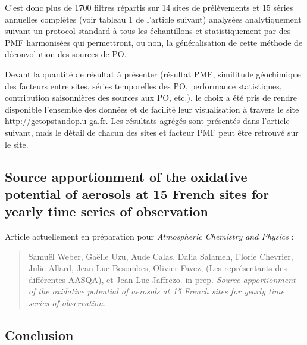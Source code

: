 C'est donc plus de 1700 filtres répartis sur 14 sites de prélèvements et 15 séries
annuelles complètes (voir tableau 1 de l'article suivant) analysées analytiquement suivant
un protocol standard à tous les échantillons et statistiquement par des PMF harmonisées
qui permettront, ou non, la généralisation de cette méthode de déconvolution des sources
de PO.

\begin{tcolorbox}[colback=red!5!white,colframe=Melon,title=Note]
    Devant la quantité de résultat à présenter (résultat PMF, similitude géochimique des
    facteurs entre sites, séries temporelles des PO, performance statistiques,
    contribution saisonnières des sources aux PO, etc.), le choix a été pris de rendre
    disponible l'ensemble des données et de facilité leur visualisation à travers le site
    \url{http://getopstandop.u-ga.fr}.
    Les résultats agrégés sont présentés dans l'article suivant, mais le détail de chacun
    des sites et facteur PMF peut être retrouvé sur le site.
\end{tcolorbox}

\subsection{Source apportionment of the oxidative potential of aerosols at 15 French
sites for yearly time series of observation}%
\label{sub:article}

\begin{tcolorbox}[colback=red!5!white,colframe=Melon,title=Note]
Article actuellement en préparation pour \textit{Atmospheric Chemistry and Physics} :
\begin{quote}
    Samuël Weber, Gaëlle Uzu, Aude Calas, Dalia Salameh, Florie Chevrier, Julie Allard,
    Jean-Luc Besombes, Olivier Favez, (Les représentants des différentes AASQA), et
    Jean-Luc Jaffrezo. in prep.
    \textit{Source apportionment of the oxidative potential of aerosols at 15 French
    sites for yearly time series of observation}.
\end{quote}
\end{tcolorbox}

\clearpage


\subsection{Conclusion}%
\label{sec:conclusion_synthèse_OP}

